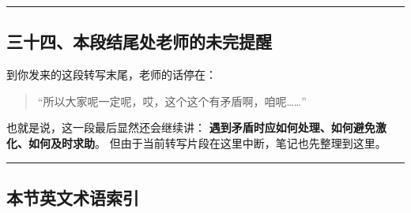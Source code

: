 \documentclass[
  chinese,
  9pt,
  a4paper,
]{ctexart}
\begin{document}
\begin{center}\rule{0.5\linewidth}{0.5pt}\end{center}

\subsection{三十四、本段结尾处老师的未完提醒}\label{ux4e09ux5341ux56dbux672cux6bb5ux7ed3ux5c3eux5904ux8001ux5e08ux7684ux672aux5b8cux63d0ux9192}

到你发来的这段转写末尾，老师的话停在：

\begin{quote}
``所以大家呢一定呢，哎，这个这个有矛盾啊，咱呢\ldots\ldots{}''
\end{quote}

也就是说，这一段最后显然还会继续讲：
\textbf{遇到矛盾时应如何处理、如何避免激化、如何及时求助}。
但由于当前转写片段在这里中断，笔记也先整理到这里。

\begin{center}\rule{0.5\linewidth}{0.5pt}\end{center}

\subsection{本节英文术语索引}\label{ux672cux8282ux82f1ux6587ux672fux8bedux7d22ux5f15}
\end{document}
